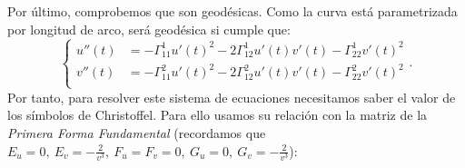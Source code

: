 Por último, comprobemos que son geodésicas. Como la curva está parametrizada por
longitud de arco, será geodésica si cumple que:
\[
\begin{cases}
    u''\left( t \right) &= - \Gamma_{11}^1 u'\left( t \right)^2 - 2 \Gamma_{12}^1
    u'\left( t \right) v'\left( t \right) - \Gamma_{22}^1 v'\left( t \right)^2\\
    v''\left( t \right) &= - \Gamma_{11}^2 u'\left( t \right)^2 - 2 \Gamma_{12}^2
    u'\left( t \right) v'\left( t \right) - \Gamma_{22}^2 v'\left( t \right)^2\\
\end{cases}.
\]
Por tanto, para resolver este sistema de ecuaciones necesitamos saber el valor
de los símbolos de Christoffel. Para ello usamos su relación con la
matriz de la \textit{Primera Forma Fundamental} (recordamos que $E_u = 0,\ E_v =
-\frac{2}{v^3},\ F_u = F_v = 0,\ G_u = 0,\ G_v = - \frac{2}{v^3}$):
